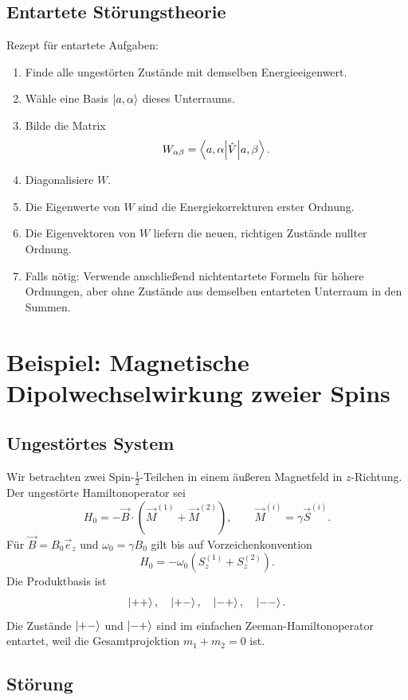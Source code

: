 \subsection{Entartete Störungstheorie}

\begin{examtipbox}
Rezept für entartete Aufgaben:
\begin{enumerate}
    \item Finde alle ungestörten Zustände mit demselben Energieeigenwert.
    \item Wähle eine Basis \(\left|a,\alpha\right\rangle\) dieses Unterraums.
    \item Bilde die Matrix
    \[
        W_{\alpha\beta}=\left\langle a,\alpha\middle|\hat V\middle|a,\beta\right\rangle.
    \]
    \item Diagonalisiere \(W\).
    \item Die Eigenwerte von \(W\) sind die Energiekorrekturen erster Ordnung.
    \item Die Eigenvektoren von \(W\) liefern die neuen, richtigen Zustände nullter Ordnung.
    \item Falls nötig: Verwende anschließend nichtentartete Formeln für höhere Ordnungen, aber ohne Zustände aus demselben entarteten Unterraum in den Summen.
\end{enumerate}
\end{examtipbox}

\section{Beispiel: Magnetische Dipolwechselwirkung zweier Spins}

\subsection{Ungestörtes System}

Wir betrachten zwei Spin-\(\frac12\)-Teilchen in einem äußeren Magnetfeld in \(z\)-Richtung. Der ungestörte Hamiltonoperator sei
\[
    H_0=-\vec B\cdot(\vec M^{(1)}+\vec M^{(2)}),
    \qquad
    \vec M^{(i)}=\gamma\vec S^{(i)}.
\]
Für \(\vec B=B_0\vec e_z\) und \(\omega_0=\gamma B_0\) gilt bis auf Vorzeichenkonvention
\[
    H_0=-\omega_0(S_z^{(1)}+S_z^{(2)}).
\]
Die Produktbasis ist
\[
    \left|++\right\rangle,\quad \left|+-\right\rangle,\quad \left|-+\right\rangle,\quad \left|--\right\rangle.
\]
Die Zustände \(\left|+-\right\rangle\) und \(\left|-+\right\rangle\) sind im einfachen Zeeman-Hamiltonoperator entartet, weil die Gesamtprojektion \(m_1+m_2=0\) ist.

\subsection{Störung}

